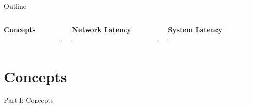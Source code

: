 \documentclass{beamer}
\newcommand{\sectionquote}[1]{%
    \def\insertsquote{\small #1}%
}
\newcommand{\insertsquote}{}
\renewcommand{\insertsquote}{}
\begin{document}
\begin{frame}{Outline}
    \begin{columns}[T,onlytextwidth]

        \begin{column}{0.31\textwidth}
            \begin{minipage}[t][1.0cm][t]{\linewidth}
                {\large\bfseries Concepts}
            \end{minipage}
            \rule{\linewidth}{0.6pt}

            \vspace{0.3cm}
            \tableofcontents[part=1]
        \end{column}

        \begin{column}{0.31\textwidth}
            \begin{minipage}[t][1.0cm][t]{\linewidth}
                {\large\bfseries Network Latency}
            \end{minipage}
            \rule{\linewidth}{0.6pt}

            \vspace{0.3cm}
            \tableofcontents[part=2]
        \end{column}

        \begin{column}{0.31\textwidth}
            \begin{minipage}[t][1.0cm][t]{\linewidth}
                {\large\bfseries System Latency}
            \end{minipage}
            \rule{\linewidth}{0.6pt}

            \vspace{0.3cm}
            \tableofcontents[part=3]
        \end{column}

    \end{columns}
\end{frame}

\part{Concepts}
\begin{frame}{Part I: Concepts}
	\tableofcontents[part=1]
\end{frame}
\sectionquote{``All economic activity is carried out through time. Every individual economic process occupies a certain time, and all linkages between economic processes necessarily involve longer or shorter periods of time.'' Friedrich Hayek}
\end{document}
